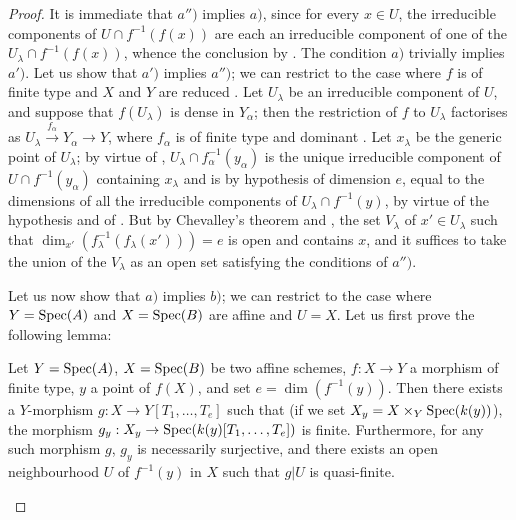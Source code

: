 \begin{proof}
It is immediate that $a'')$ implies $a)$, since for every $x\in U$, the irreducible components of $U\cap f^{-1}(f(x))$ are each an irreducible component of one of the $U_\lambda\cap f^{-1}(f(x))$, whence the conclusion by .
The condition $a)$ trivially implies $a')$.
Let us show that $a')$ implies $a'')$; we can restrict to the case where $f$ is of finite type and $X$ and $Y$ are reduced .
Let $U_\lambda$ be an irreducible component of $U$, and suppose that $f(U_\lambda)$ is dense in $Y_\alpha$; then the restriction of $f$ to $U_\lambda$ factorises as $U_\lambda\xrightarrow{f_\alpha}Y_\alpha\longrightarrow Y$, where $f_\alpha$ is of finite type and dominant .
Let $x_\lambda$ be the generic point of $U_\lambda$; by virtue of , $U_\lambda\cap f_\alpha^{-1}(y_\alpha)$ is the unique irreducible component of $U\cap f^{-1}(y_\alpha)$ containing $x_\lambda$ and is by hypothesis of dimension $e$, equal to the dimensions of all the irreducible components of $U_\lambda\cap f^{-1}(y)$, by virtue of the hypothesis and of .
But by Chevalley's theorem  and , the set $V_\lambda$ of $x'\in U_\lambda$ such that $\dim_{x'}(f_\lambda^{-1}(f_\lambda(x')))=e$ is open and contains $x$, and it suffices to take the union of the $V_\lambda$ as an open set satisfying the conditions of $a'')$.

Let us now show that $a)$ implies $b)$; we can restrict to the case where $Y=\operatorname{Spec}(A)$ and $X=\operatorname{Spec}(B)$ are affine and $U=X$.
Let us first prove the following lemma:

\begin{lemma}[13.3.1.1]
\label{IV.13.3.1.1}
Let $Y=\operatorname{Spec}(A)$, $X=\operatorname{Spec}(B)$ be two affine schemes, $f:X\to Y$ a morphism of finite type, $y$ a point of $f(X)$, and set $e=\dim(f^{-1}(y))$.
Then there exists a $Y$-morphism $g:X\to Y[T_1,\ldots,T_e]$ such that (if we set $X_y=X\times_Y\operatorname{Spec}(k(y))$), the morphism $g_y:X_y\to\operatorname{Spec}(k(y)[T_1,\ldots,T_e])$ is finite.
Furthermore, for any such morphism $g$, $g_y$ is necessarily surjective, and there exists an open neighbourhood $U$ of $f^{-1}(y)$ in $X$ such that $g|U$ is quasi-finite.
\end{lemma}


\end{proof}
